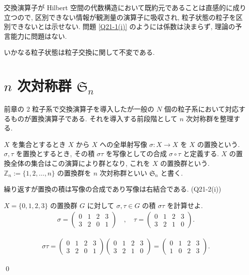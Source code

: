 \documentclass[uplatex,dvipdfmx,a4paper,11pt]{jlreq}
\makeatletter
\newcommand{\ZZ}{\mathbb{Z}}
\renewcommand{\SS}{\mathfrak{S}}
\numberwithin{equation}{section}
\theoremstyle{definition}
\renewenvironment{proof}[1][\proofname]{\par
  \normalfont
  \topsep6\p@\@plus6\p@ \trivlist
  \item[\hskip\labelsep{\bfseries #1}\@addpunct{\bfseries}]\ignorespaces\quad\par
}{
  \qed\endtrivlist\@endpefalse
}
\renewcommand\proofname{証明}
\makeatother
\begin{document}
\begin{problem}[Q21-1(xi)]
交換演算子が Hilbert 空間の代数構造において既約元であることは直感的に成り立つので, 区別できない情報が観測量の演算子に吸収され, 粒子状態の粒子を区別できないとは示せない. 問題 \ref{Q21-1(i)} のようには係数は決まらず, 理論の予言能力に問題はない.
\end{problem}


\begin{axiom}[対称化の要請]
  いかなる粒子状態は粒子交換に関して不変である.
\end{axiom}

\section{$n$ 次対称群 $\SS_n$}
前章の 2 粒子系で交換演算子を導入したが一般の $N$ 個の粒子系において対応するものが置換演算子である. それを導入する前段階として $n$ 次対称群を整理する.
\begin{definition}[$n$ 次対称群]
  $X$ を集合とするとき $X$ から $X$ への全単射写像 $\sigma: X\to X$ を $X$ の置換という.
  $\sigma,\tau$ を置換とするとき, その積 $\sigma\tau$ を写像としての合成 $\sigma\circ\tau$ と定義する. $X$ の置換全体の集合はこの演算により群となり, これを $X$ の置換群という.
  $\ZZ_n := \{1,2,\ldots,n\}$ の置換群を $n$ 次対称群といい $\SS_n$ と書く.
\end{definition}
繰り返すが置換の積は写像の合成であり写像は右結合である. (Q21-2(i))
\begin{problem}[Q21-2(ii)]
$X = \{0, 1, 2, 3\}$ の置換群 $G$ に対して $\sigma,\tau\in G$ の積 $\sigma\tau$ を計算せよ.
\begin{align}
  \sigma = \begin{pmatrix}
             0 & 1 & 2 & 3 \\
             3 & 2 & 0 & 1
           \end{pmatrix} \quad , \quad
  \tau = \begin{pmatrix}
           0 & 1 & 2 & 3 \\
           3 & 2 & 1 & 0
         \end{pmatrix}.
\end{align}
\end{problem}
\begin{proof}
  \begin{align}
    \sigma\tau =
    \begin{pmatrix}
      0 & 1 & 2 & 3 \\
      3 & 2 & 0 & 1
    \end{pmatrix}
    \begin{pmatrix}
      0 & 1 & 2 & 3 \\
      3 & 2 & 1 & 0
    \end{pmatrix}
    =
    \begin{pmatrix}
      0 & 1 & 2 & 3 \\
      1 & 0 & 2 & 3
    \end{pmatrix}.
  \end{align}
\end{proof}
\end{document}
